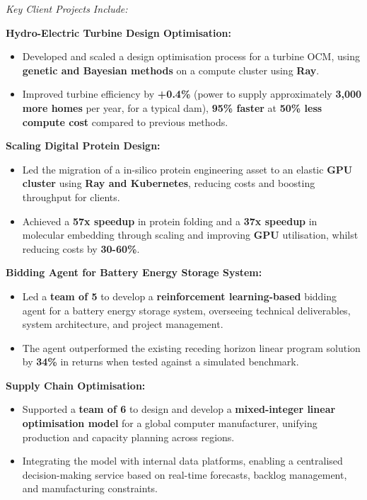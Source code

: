 \documentclass[a4paper]{deedy-resume} %
\begin{document}
\textit{Key Client Projects Include:}
\vspace{-10pt}
\begin{multicols}{2}
    \vspace{0.1cm}
    \textbf{Hydro-Electric Turbine Design Optimisation:}
    \begin{itemize}
        \item Developed and scaled a design optimisation process for a turbine OCM, using \textbf{genetic and Bayesian methods} on a compute cluster using \textbf{Ray}.
        \item Improved turbine efficiency by \textbf{+0.4\%} (power to supply approximately \textbf{3,000 more homes} per year, for a typical dam), \textbf{95\% faster} at \textbf{50\% less compute cost} compared to previous methods.
    \end{itemize}

    \vspace{0.2cm}
    \textbf{Scaling Digital Protein Design:}
    \begin{itemize}
        \item Led the migration of a in-silico protein engineering asset to an elastic \textbf{GPU cluster} using \textbf{Ray and Kubernetes}, reducing costs and boosting throughput for clients.
        \item Achieved a \textbf{57x speedup} in protein folding and a \textbf{37x speedup} in molecular embedding through scaling and improving \textbf{GPU} utilisation, whilst reducing costs by \textbf{30-60\%}.
    \end{itemize}


    \columnbreak

    \vspace{0.1cm}
    \textbf{Bidding Agent for Battery Energy Storage System:}
    \begin{itemize}
        \item Led a \textbf{team of 5} to develop a \textbf{reinforcement learning-based} bidding agent for a battery energy storage system, 
        overseeing technical deliverables, system architecture, and project management.
        \item The agent outperformed the existing receding horizon linear program solution by \textbf{34\%} in returns when tested against a simulated benchmark.
    \end{itemize}

    \vspace{0.2cm}
    \textbf{Supply Chain Optimisation:}
    \begin{itemize}
        \item Supported a \textbf{team of 6} to design and develop a \textbf{mixed-integer linear optimisation model} for a global computer manufacturer, unifying production and capacity planning across regions.
        \item Integrating the model with internal data platforms, enabling a centralised decision-making service based on real-time forecasts, backlog management, and manufacturing constraints.
    \end{itemize}

\end{multicols}
\end{document}
